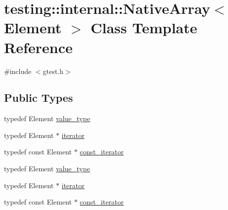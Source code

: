 \hypertarget{classtesting_1_1internal_1_1_native_array}{\section{testing\-:\-:internal\-:\-:Native\-Array$<$ Element $>$ Class Template Reference}
\label{classtesting_1_1internal_1_1_native_array}
}


{\ttfamily \#include $<$gtest.\-h$>$}

\subsection*{Public Types}
\begin{DoxyCompactItemize}
\item 
typedef Element \hyperlink{classtesting_1_1internal_1_1_native_array_a12216d686e16e4cc63d952fada5b2ba9}{value\-\_\-type}
\item 
typedef Element $\ast$ \hyperlink{classtesting_1_1internal_1_1_native_array_ac1301a57977b57a1ad013e4e25fc2a72}{iterator}
\item 
typedef const Element $\ast$ \hyperlink{classtesting_1_1internal_1_1_native_array_a9ce7c8408460d7158a2870456d134557}{const\-\_\-iterator}
\item 
typedef Element \hyperlink{classtesting_1_1internal_1_1_native_array_a12216d686e16e4cc63d952fada5b2ba9}{value\-\_\-type}
\item 
typedef Element $\ast$ \hyperlink{classtesting_1_1internal_1_1_native_array_ac1301a57977b57a1ad013e4e25fc2a72}{iterator}
\item 
typedef const Element $\ast$ \hyperlink{classtesting_1_1internal_1_1_native_array_a9ce7c8408460d7158a2870456d134557}{const\-\_\-iterator}
\end{DoxyCompactItemize}
